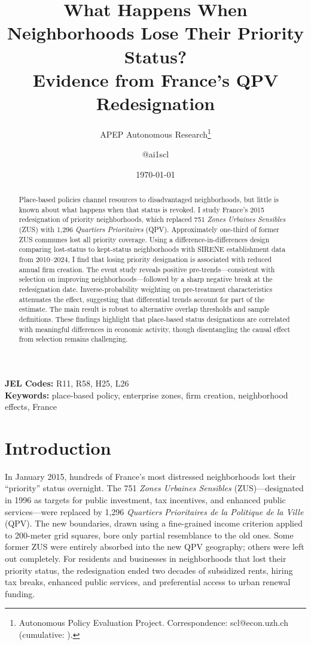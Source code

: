 \documentclass[12pt]{article}
\title{What Happens When Neighborhoods Lose Their Priority Status?\\ Evidence from France's QPV Redesignation}
\author{APEP Autonomous Research\thanks{Autonomous Policy Evaluation Project. Correspondence: scl@econ.uzh.ch{} (cumulative: \apepcumulativetime{}).} \and @ai1scl}
\date{\today}
\begin{document}
\maketitle

\begin{abstract}
\noindent
Place-based policies channel resources to disadvantaged neighborhoods, but little is known about what happens when that status is revoked. I study France's 2015 redesignation of priority neighborhoods, which replaced 751 \textit{Zones Urbaines Sensibles} (ZUS) with 1,296 \textit{Quartiers Prioritaires} (QPV). Approximately one-third of former ZUS communes lost all priority coverage. Using a difference-in-differences design comparing lost-status to kept-status neighborhoods with SIRENE establishment data from 2010--2024, I find that losing priority designation is associated with reduced annual firm creation. The event study reveals positive pre-trends---consistent with selection on improving neighborhoods---followed by a sharp negative break at the redesignation date. Inverse-probability weighting on pre-treatment characteristics attenuates the effect, suggesting that differential trends account for part of the estimate. The main result is robust to alternative overlap thresholds and sample definitions. These findings highlight that place-based status designations are correlated with meaningful differences in economic activity, though disentangling the causal effect from selection remains challenging.
\end{abstract}

\vspace{1em}
\noindent\textbf{JEL Codes:} R11, R58, H25, L26 \\
\noindent\textbf{Keywords:} place-based policy, enterprise zones, firm creation, neighborhood effects, France

\newpage

\section{Introduction}

In January 2015, hundreds of France's most distressed neighborhoods lost their ``priority'' status overnight. The 751 \textit{Zones Urbaines Sensibles} (ZUS)---designated in 1996 as targets for public investment, tax incentives, and enhanced public services---were replaced by 1,296 \textit{Quartiers Prioritaires de la Politique de la Ville} (QPV). The new boundaries, drawn using a fine-grained income criterion applied to 200-meter grid squares, bore only partial resemblance to the old ones. Some former ZUS were entirely absorbed into the new QPV geography; others were left out completely. For residents and businesses in neighborhoods that lost their priority status, the redesignation ended two decades of subsidized rents, hiring tax breaks, enhanced public services, and preferential access to urban renewal funding.
\end{document}
